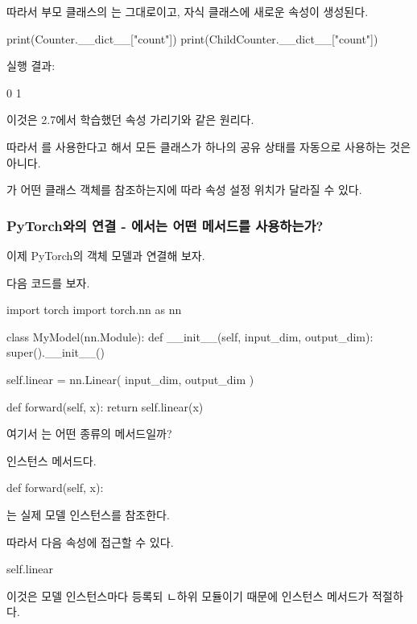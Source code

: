 따라서 부모 클래스의 는 그대로이고, 자식 클래스에 새로운  속성이 생성된다.

\begin{dhkcode}
print(Counter.__dict__["count"])
print(ChildCounter.__dict__["count"])
\end{dhkcode}

실행 결과:

\begin{dhkzsh}
0
1
\end{dhkzsh}

이것은 2.7에서 학습했던 속성 가리기와 같은 원리다.

따라서 를 사용한다고 해서 모든 클래스가 하나의 공유 상태를 자동으로 사용하는 것은 아니다.

가 어떤 클래스 객체를 참조하는지에 따라 속성 설정 위치가 달라질 수 있다.

\subsubsection{PyTorch와의 연결 - 에서는 어떤 메서드를 사용하는가?}

이제 PyTorch의 객체 모델과 연결해 보자.

다음 코드를 보자.

\begin{dhkcode}
import torch
import torch.nn as nn


class MyModel(nn.Module):
    def __init__(self, input_dim, output_dim):
        super().__init__()

        self.linear = nn.Linear(
            input_dim,
            output_dim
        )

    def forward(self, x):
        return self.linear(x)
\end{dhkcode}

여기서 는 어떤 종류의 메서드일까?

인스턴스 메서드다.

\begin{dhkcode}
def forward(self, x):
\end{dhkcode}

는 실제 모델 인스턴스를 참조한다.

따라서 다음 속성에 접근할 수 있다.

\begin{dhkcode}
self.linear
\end{dhkcode}

이것은 모델 인스턴스마다 등록되 ㄴ하위 모듈이기 때문에 인스턴스 메서드가 적절하다.

